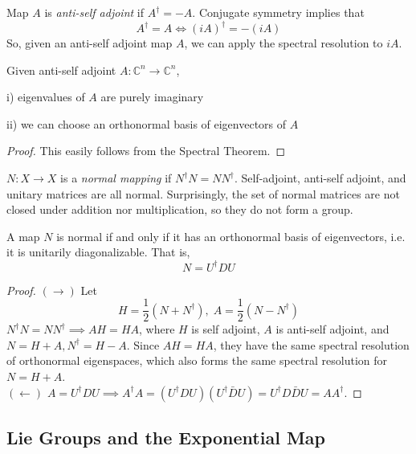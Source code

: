 \documentclass{article}
\begin{document}
    \begin{definition}
    Map $A$ is \textit{anti-self adjoint }if $A^\dagger = - A$. Conjugate symmetry implies that
    \[ A^\dagger = A \iff (i A)^\dagger = - (i A)\]
    So, given an anti-self adjoint map $A$, we can apply the spectral resolution to $iA$. 
    \end{definition}

    \begin{theorem}
    Given anti-self adjoint $A: \mathbb{C}^n \longrightarrow \mathbb{C}^n$, 

    i) eigenvalues of $A$ are purely imaginary

    ii) we can choose an orthonormal basis of eigenvectors of $A$
    \end{theorem}

    \begin{proof}
    This easily follows from the Spectral Theorem. 
    \end{proof}

    \begin{definition}
    $N: X \longrightarrow X$ is a \textit{normal mapping} if $N^\dagger N = N N^\dagger$. Self-adjoint, anti-self adjoint, and unitary matrices are all normal. Surprisingly, the set of normal matrices are not closed under addition nor multiplication, so they do not form a group. 
    \end{definition}

    \begin{theorem}
    A map $N$ is normal if and only if it has an orthonormal basis of eigenvectors, i.e. it is unitarily diagonalizable. That is, 
    \[N = U^\dagger D U \]
    \end{theorem}

    \begin{proof}
    $(\rightarrow)$ Let 
    \[H = \frac{1}{2} (N + N^\dagger), \; A = \frac{1}{2} (N - N^\dagger)\]
    $N^\dagger N = N N^\dagger \implies A H = H A$, where $H$ is self adjoint, $A$ is anti-self adjoint, and $N = H + A, N^\dagger = H - A$. Since $A H = H A$, they have the same spectral resolution of orthonormal eigenspaces, which also forms the same spectral resolution for $N = H + A$. \\
    $(\leftarrow)$ $A = U^\dagger D U \implies A^\dagger A = (U^\dagger D U) (U^\dagger \bar{D} U) = U^\dagger D \bar{D} U = A A^\dagger$. 
    \end{proof}

  \subsection{Lie Groups and the Exponential Map}
\end{document}

